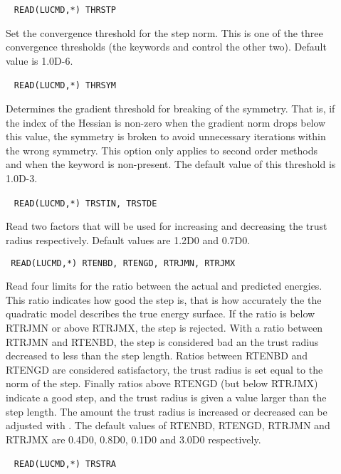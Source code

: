 \begin{description}
\item[]\verb| |
\newline
\verb|READ(LUCMD,*) THRSTP|

Set the convergence threshold for the step norm. This is one of the
three convergence thresholds (the keywords  and
 control the other two). Default value is 1.0D-6.

\item[]\verb| |
\newline
\verb|READ(LUCMD,*) THRSYM|

Determines the gradient threshold for breaking of the symmetry. That
is, if the index of the Hessian is non-zero when the gradient norm
drops below this value, the symmetry is broken to avoid unnecessary
iterations within the wrong symmetry. This option only applies to
second order methods and when the keyword  is
non-present. The default value of this threshold is 1.0D-3.

\item[]\verb| |
\newline
\verb|READ(LUCMD,*) TRSTIN, TRSTDE|

Read two factors that will be used for increasing and decreasing the
trust radius respectively. Default values are 1.2D0 and 0.7D0.

\item[]\verb| |
\newline
\verb|READ(LUCMD,*) RTENBD, RTENGD, RTRJMN, RTRJMX|

Read four limits for the ratio between the actual and predicted
energies. This ratio indicates how good the step is, that
is how accurately the the quadratic model describes the true energy
surface. If the ratio is below RTRJMN or above RTRJMX, the step is
rejected. With a ratio between RTRJMN and RTENBD, the step is
considered bad an the trust radius decreased to less than the step
length. Ratios between RTENBD and RTENGD are considered satisfactory,
the trust radius is set equal to the norm of the step. Finally ratios
above RTENGD (but below RTRJMX) indicate a good step, and the trust
radius is given a value larger than the step length. The amount the
trust radius is increased or decreased can be adjusted with . The default values of RTENBD, RTENGD, RTRJMN and RTRJMX are
0.4D0, 0.8D0, 0.1D0 and 3.0D0 respectively.

\item[]\verb| |
\newline
\verb|READ(LUCMD,*) TRSTRA|


\end{description}
